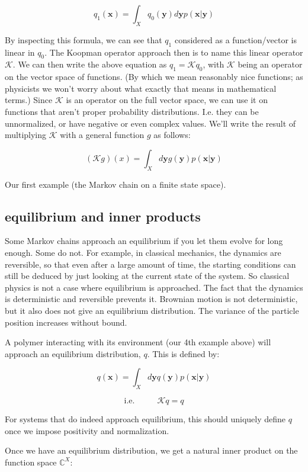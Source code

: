 \documentclass[]{article}
\newcommand{\w}[1]{\mathbf{#1}}
\newcommand{\CC}{\mathbb{C}}
\newcommand{\Kp}{\mathcal{K}}
\begin{document}
$$
q_1(\w{x}) = \int_X q_0(\w{y})d\w{y} p(\w{x} | \w{y})
$$

By inspecting this formula, we can see that $q_1$ considered as a function/vector is linear in $q_0$. The Koopman operator approach then is to name this linear operator $\Kp$. We can then write the above equation as $q_1 = \Kp q_0$, with $\Kp$ being an operator on the vector space of functions. (By which we mean reasonably nice functions; as physicists we won't worry about what exactly that means in mathematical terms.) Since $\Kp$ is an operator on the full vector space, we can use it on functions that aren't proper probability distributions. I.e. they can be unnormalized, or have negative or even complex values. We'll write the result of multiplying $\Kp$ with a general function $g$ as follows:

$$
(\Kp g)(x) = \int_X d\w{y} g(\w{y}) p(\w{x}|\w{y})
$$

Our first example (the Markov chain on a finite state space).

\subsection{equilibrium and inner products}

Some Markov chains approach an equilibrium if you let them evolve for long enough. Some do not. For example, in classical mechanics, the dynamics are reversible, so that even after a large amount of time, the starting conditions can still be deduced by just looking at the current state of the system. So classical physics is not a case where equilibrium is approached. The fact that the dynamics is deterministic and reversible prevents it. Brownian motion is not deterministic, but it also does not give an equilibrium distribution. The variance of the particle position increases without bound.

A polymer interacting with its environment (our 4th example above) will approach an equilibrium distribution, $q$. This is defined by:

$$
q(\w{x}) = \int_X d\w{y} q(\w{y}) p(\w{x}|\w{y})
$$

$$
\text{i.e. } \hspace{1cm} \Kp q = q
$$

For systems that do indeed approach equilibrium, this should uniquely define $q$ once we impose positivity and normalization.

Once we have an equilibrium distribution, we get a natural inner product on the function space $\CC^X$:
\end{document}
